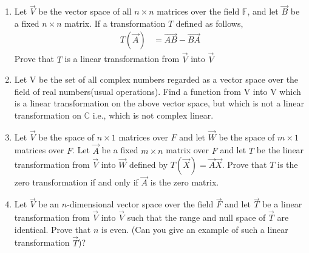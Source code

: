 \begin{enumerate}[label=\thesubsection.\arabic*.,ref=\thesubsection.\theenumi]
%
\\
\solution

\item Let $\vec{V}$ be the vector space of all $n \times n$ matrices over the field $\mathbb{F}$, and let $\vec{B}$ be a fixed $n \times n$ matrix. If a transformation $T$ defined as follows,
\begin{align*}
    T(\vec{A}) &= \vec{AB} - \vec{BA}
\end{align*}
Prove that $T$ is a linear transformation from $\vec{V}$ into $\vec{V}$
%
\solution

%
\item Let V be the set of all complex numbers regarded as a vector space over the field of real numbers(usual operations). Find a function from V into V which is a linear transformation on the above vector space, but which is not a linear transformation on $\mathbb{C}$ i.e., which is not complex linear.
%
\\
\solution

%
\item Let $\vec{V}$ be the space of $n \times 1$ matrices over $F$ and let $\vec{W}$ be the space of $m \times 1$ matrices over $F$. Let $\vec{A}$ be a fixed $m \times n$ matrix over $F$ and let $T$ be the linear transformation from $\vec{V}$ into $\vec{W}$ defined by $T(\vec{X}) = \vec{A}\vec{X}$. Prove that $T$ is the zero transformation if and only if $\vec{A}$ is the zero matrix.
%
\solution

%
\item Let $\vec{V}$ be an $n$-dimensional vector space over the field $\vec{F}$ and let $\vec{T}$ be a linear transformation from $\vec{V}$ into $\vec{V}$ such that the range and null space of $\vec{T}$ are identical. Prove that $n$ is even. (Can you give an example of such a linear transformation $\vec{T}$)?
%
\solution

\end{enumerate}
